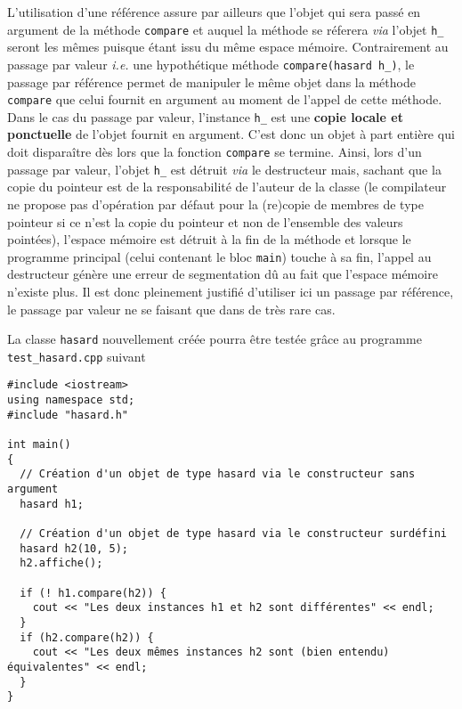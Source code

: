\documentclass{book}
\begin{document}
\begin{correction}
L'utilisation d'une référence assure par ailleurs que l'objet qui sera passé en
argument de la méthode \texttt{compare} et auquel la méthode se réferera \emph{via} l'objet \texttt{h\_}
seront les mêmes puisque étant issu du même espace mémoire. Contrairement au
passage par valeur \emph{i.e.} une hypothétique méthode \texttt{compare(hasard h\_)}, le passage
par référence permet de manipuler le même objet dans la méthode \texttt{compare} que
celui fournit en argument au moment de l'appel de cette méthode. Dans le cas du
passage par valeur, l'instance \texttt{h\_} est une \textbf{copie locale et ponctuelle} de l'objet
fournit en argument. C'est donc un objet à part entière qui doit disparaître dès
lors que la fonction \texttt{compare} se termine. Ainsi, lors d'un passage par valeur,
l'objet \texttt{h\_} est détruit \emph{via} le destructeur mais, sachant que la copie du pointeur
est de la responsabilité de l'auteur de la classe (le compilateur ne propose pas
d'opération par défaut pour la (re)copie de membres de type pointeur si ce n'est
la copie du pointeur et non de l'ensemble des valeurs pointées), l'espace
mémoire est détruit à la fin de la méthode et lorsque le programme principal
(celui contenant le bloc \texttt{main}) touche à sa fin, l'appel au destructeur génère
une erreur de segmentation dû au fait que l'espace mémoire n'existe plus. Il est
donc pleinement justifié d'utiliser ici un passage par référence, le passage par
valeur ne se faisant que dans de très rare cas.

La classe \texttt{hasard} nouvellement créée pourra être testée grâce au programme \texttt{test\_hasard.cpp}
suivant
\begin{verbatim}
#include <iostream>
using namespace std;
#include "hasard.h"

int main()
{
  // Création d'un objet de type hasard via le constructeur sans argument
  hasard h1;

  // Création d'un objet de type hasard via le constructeur surdéfini
  hasard h2(10, 5);
  h2.affiche();

  if (! h1.compare(h2)) {
    cout << "Les deux instances h1 et h2 sont différentes" << endl;
  }
  if (h2.compare(h2)) {
    cout << "Les deux mêmes instances h2 sont (bien entendu) équivalentes" << endl;
  }
}
\end{verbatim}


\end{correction}
\end{document}
